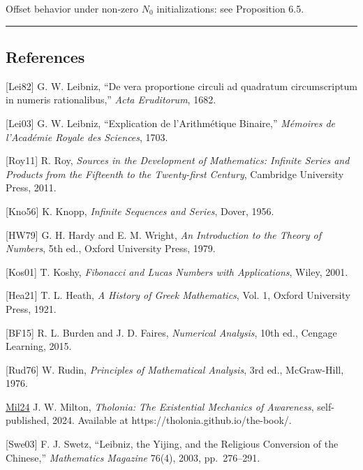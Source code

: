 \documentclass[
  11pt,
  letterpaper,
]{article}
\begin{document}
Offset behavior under non-zero \(N_0\) initializations: see Proposition
6.5.

\begin{center}\rule{0.5\linewidth}{0.5pt}\end{center}

\subsection{References}\label{references}

{[}Lei82{]} G. W. Leibniz, ``De vera proportione circuli ad quadratum
circumscriptum in numeris rationalibus,'' \emph{Acta Eruditorum}, 1682.

{[}Lei03{]} G. W. Leibniz, ``Explication de l'Arithmétique Binaire,''
\emph{Mémoires de l'Académie Royale des Sciences}, 1703.

{[}Roy11{]} R. Roy, \emph{Sources in the Development of Mathematics:
Infinite Series and Products from the Fifteenth to the Twenty-first
Century}, Cambridge University Press, 2011.

{[}Kno56{]} K. Knopp, \emph{Infinite Sequences and Series}, Dover, 1956.

{[}HW79{]} G. H. Hardy and E. M. Wright, \emph{An Introduction to the
Theory of Numbers}, 5th ed., Oxford University Press, 1979.

{[}Kos01{]} T. Koshy, \emph{Fibonacci and Lucas Numbers with
Applications}, Wiley, 2001.

{[}Hea21{]} T. L. Heath, \emph{A History of Greek Mathematics}, Vol. 1,
Oxford University Press, 1921.

{[}BF15{]} R. L. Burden and J. D. Faires, \emph{Numerical Analysis},
10th ed., Cengage Learning, 2015.

{[}Rud76{]} W. Rudin, \emph{Principles of Mathematical Analysis}, 3rd
ed., McGraw-Hill, 1976.

\href{https://tholonia.github.io/the-book/}{Mil24} J. W. Milton,
\emph{Tholonia: The Existential Mechanics of Awareness}, self-published,
2024. Available at https://tholonia.github.io/the-book/.

{[}Swe03{]} F. J. Swetz, ``Leibniz, the Yijing, and the Religious
Conversion of the Chinese,'' \emph{Mathematics Magazine} 76(4), 2003,
pp.~276--291.
\end{document}
